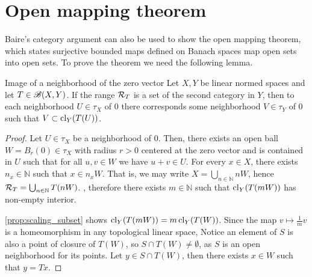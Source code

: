 \section{Open mapping theorem}
Baire's category argument can also be used to show the open mapping theorem, which states surjective bounded maps defined on Banach spaces map open sets into open sets. To prove the theorem we need the following lemma.
\begin{lemma}{Image of a neighborhood of the zero vector}{}
    Let \(X,Y\) be linear normed spaces and let \(T \in \mathscr{B}(X,Y)\). If the range \(\mathcal{R}_{T}\) is a set of the second category in \(Y\), then to each neighborhood \(U \in \tau_X\) of \(0\) there corresponds some neighborhood \(V \in \tau_Y\) of \(0\) such that \(V \subset \operatorname{cl}_Y(T(U))\).
\end{lemma}
\begin{proof}
    Let \(U \in \tau_X\) be a neighborhood of \(0\). Then, there exists an open ball \(W = B_r(0) \in \tau_X\) with radius \(r > 0\) centered at the zero vector and is contained in \(U\) such that for all \(u, v \in W\) we have \(u + v \in U\). For every \(x \in X\), there exists \(n_x \in \mathbb{N}\) such that \(x \in n_x W\). That is, we may write \(X = \bigcup_{n\in \mathbb{N}} nW\), hence \(\mathcal{R}_{T} = \bigcup_{n\in \mathbb{N}} T(nW)\). , therefore there exists \(m \in \mathbb{N}\) such that \(\operatorname{cl}_Y(T(mW))\) has non-empty interior.

    \cref{prop:scaling_subset} shows \(\operatorname{cl}_Y(T(mW)) = m \operatorname{cl}_Y(T(W))\). Since the map \(v \mapsto \frac1m v\) is a homeomorphism in any topological linear space, \todo[then \(S = \inte_Y\cl_Y(T(W))\) has non-empty interior.] Notice an element of \(S\) is also a point of closure of \(T(W)\), so \(S \cap T(W) \neq \emptyset\), as \(S\) is an open neighborhood for its points. Let \(y \in S \cap T(W)\), then there exists \(x \in W\) such that \(y = Tx\).

\end{proof}
